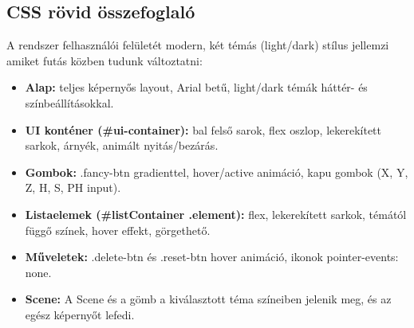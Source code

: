 \documentclass[12pt]{article}
\begin{document}
	\subsection{CSS rövid összefoglaló}
	A rendszer felhasználói felületét modern, két témás (light/dark) stílus jellemzi amiket futás közben tudunk változtatni:
	
	\begin{itemize}
		\item \textbf{Alap:} teljes képernyős layout, Arial betű, light/dark témák háttér- és színbeállításokkal.
		\item \textbf{UI konténer (\#ui-container):} bal felső sarok, flex oszlop, lekerekített sarkok, árnyék, animált nyitás/bezárás.
		\item \textbf{Gombok:} .fancy-btn gradienttel, hover/active animáció, kapu gombok (X, Y, Z, H, S, PH input).
		\item \textbf{Listaelemek (\#listContainer .element):} flex, lekerekített sarkok, témától függő színek, hover effekt, görgethető.
		\item \textbf{Műveletek:} .delete-btn és .reset-btn hover animáció, ikonok pointer-events: none.
		\item \textbf{Scene:} A Scene és a gömb a kiválasztott téma színeiben jelenik meg, és az egész képernyőt lefedi.
		
		
	\end{itemize}
	
	
	
\end{document}
